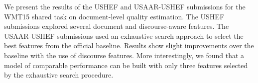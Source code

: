 We present the results of the USHEF and USAAR-USHEF submissions for the WMT15 shared task on document-level quality estimation. The USHEF submissions explored several document and discourse-aware features. The USAAR-USHEF submissions used an exhaustive search approach to select the best features from the official baseline. Results show slight improvements over the baseline with the use of discourse features. More interestingly, we found that a model of comparable performance can be built with only three features selected by the exhaustive search procedure.

